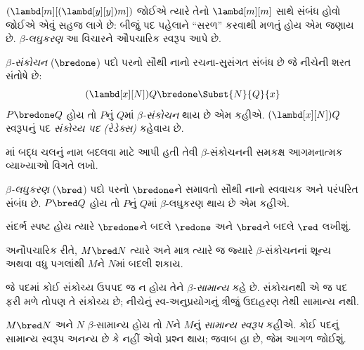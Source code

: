 \begingroup
\makeatletter{}\makeatother

\label{guunit:OLP-0365}


$(\lambd[m][(\lambd[y][y]) m])$ જોઈએ ત્યારે તેનો
$\lambd[m][m]$ સાથે સંબંધ હોવો જોઈએ એવું સહજ લાગે છે:
બીજું પદ પહેલાને ``સરળ'' કરવાથી મળતું હોય એમ જણાય છે.
\emph{$\beta$-લઘુકરણ} આ વિચારને ઔપચારિક સ્વરૂપ આપે છે.

\begin{defn} 
  \emph{$\beta$-સંકોચન} ($\bredone$) પદો પરનો સૌથી
  નાનો રચના-સુસંગત સંબંધ છે જે નીચેની શરત સંતોષે છે:
  \[
    (\lambd[x][N])Q \bredone \Subst{N}{Q}{x} 
  \]
  $P \bredone Q$ હોય તો $P$નું $Q$માં
  \emph{$\beta$-સંકોચન} થાય છે એમ કહીએ. $(\lambd[x][N])Q$
  સ્વરૂપનું પદ \emph{સંકોચ્ય પદ (રેડેક્સ)} કહેવાય છે.
\end{defn}

\begin{prob} 
  માં બદ્ધ ચલનું નામ
  બદલવા માટે આપી હતી તેવી $\beta$-સંકોચનની સમકક્ષ
  આગમનાત્મક વ્યાખ્યાઓ વિગતે લખો.
\end{prob}
  
\begin{defn} 
  \emph{$\beta$-લઘુકરણ} ($\bred$) પદો પરનો
  $\bredone$ને સમાવતો સૌથી નાનો સ્વવાચક અને
  પરંપરિત સંબંધ છે. $P \bred Q$ હોય તો $P$નું
  $Q$માં $\beta$-લઘુકરણ થાય છે એમ કહીએ.
\end{defn}

સંદર્ભ સ્પષ્ટ હોય ત્યારે $\bredone$ને બદલે $\redone$
અને $\bred$ને બદલે $\red$ લખીશું.

અનૌપચારિક રીતે, $M \bred N$ ત્યારે અને માત્ર ત્યારે જ
જ્યારે $\beta$-સંકોચનનાં શૂન્ય અથવા વધુ પગલાંથી
$M$ને $N$માં બદલી શકાય.

\begin{defn}[$\beta$-સામાન્ય]
જે પદમાં કોઈ સંકોચ્ય ઉપપદ જ ન હોય તેને
\emph{$\beta$-સામાન્ય} કહે છે.
સંકોચનથી એ જ પદ ફરી મળે તોપણ તે સંકોચ્ય છે; નીચેનું
સ્વ-અનુપ્રયોગનું ત્રીજું ઉદાહરણ તેથી સામાન્ય નથી.
\end{defn}

$M \bred N$ અને $N$ $\beta$-સામાન્ય હોય તો $N$ને
$M$નું \emph{સામાન્ય સ્વરૂપ} કહીએ. કોઈ પદનું સામાન્ય
સ્વરૂપ અનન્ય છે કે નહીં એવો પ્રશ્ન થાય; જવાબ હા છે,
જેમ આગળ જોઈશું.

